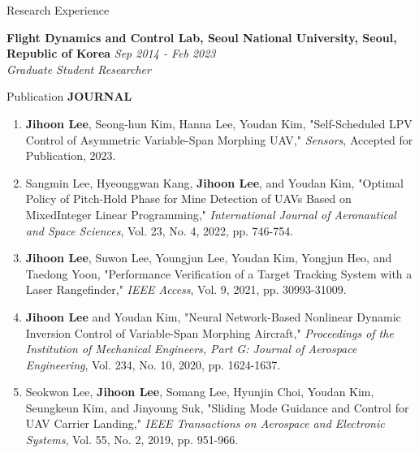 \documentclass{resume}
\begin{document}
\begin{rSection}{Research Experience}\normalfont

{\bf Flight Dynamics and Control Lab, Seoul National University, Seoul, Republic of Korea} \hfill {\em Sep 2014 - Feb 2023} 
\\{\textit{Graduate Student Researcher}}

\end{rSection}

\begin{rSection}{Publication}\normalfont
	\textbf{JOURNAL}
	\begin{enumerate}\renewcommand{\labelenumi}{[J\theenumi]}
		\item \textbf{\color{coolblack}Jihoon Lee}, Seong-hun Kim, Hanna Lee, Youdan Kim, "Self-Scheduled LPV Control of Asymmetric Variable-Span Morphing UAV," \textit{Sensors}, Accepted for Publication, 2023.

		\item Sangmin Lee, Hyeonggwan Kang, \textbf{\color{coolblack}Jihoon Lee}, and Youdan Kim, "Optimal Policy of Pitch-Hold Phase for Mine Detection of UAVs Based on MixedInteger Linear Programming," \textit{International Journal of Aeronautical and Space Sciences}, Vol. 23, No. 4, 2022, pp. 746-754.
		
		\item \textbf{\color{coolblack}Jihoon Lee}, Suwon Lee, Youngjun Lee, Youdan Kim, Yongjun Heo, and Taedong Yoon, "Performance Veriﬁcation of a Target Tracking System with a Laser Rangeﬁnder," \textit{IEEE Access}, Vol. 9, 2021, pp. 30993-31009.
		
		\item \textbf{\color{coolblack}Jihoon Lee} and Youdan Kim, "Neural Network-Based Nonlinear Dynamic Inversion Control of Variable-Span Morphing Aircraft," \textit{Proceedings of the Institution of Mechanical Engineers, Part G: Journal of Aerospace Engineering}, Vol. 234, No. 10, 2020, pp. 1624-1637. 
		
		\item Seokwon Lee, \textbf{\color{coolblack}Jihoon Lee}, Somang Lee, Hyunjin Choi, Youdan Kim, Seungkeun Kim, and Jinyoung Suk, "Sliding Mode Guidance and Control for UAV Carrier Landing," \textit{IEEE Transactions on Aerospace and Electronic Systems}, Vol. 55, No. 2, 2019, pp. 951-966. 
		

\end{enumerate}
\end{rSection}
\end{document}

